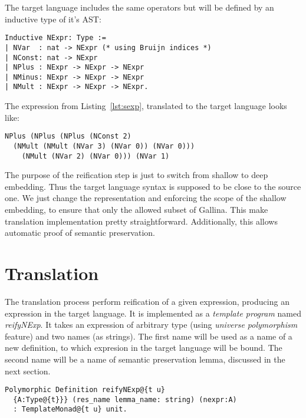 \documentclass[sigplan]{acmart}\settopmatter{printfolios=true,printccs=false,printacmref=false}
\begin{document}
The target language includes the same operators but will be defined by
an inductive type of it's AST:

\begin{lstlisting}[language=Coq, mathescape=true,
  frame=single,basicstyle=\footnotesize]
Inductive NExpr: Type :=
| NVar  : nat -> NExpr (* using Bruijn indices *)
| NConst: nat -> NExpr
| NPlus : NExpr -> NExpr -> NExpr
| NMinus: NExpr -> NExpr -> NExpr
| NMult : NExpr -> NExpr -> NExpr.
\end{lstlisting}

The expression from Listing~\ref{lst:sexp}, translated to the target
language looks like:

\begin{lstlisting}[language=Coq, mathescape=true,
  frame=single, basicstyle=\footnotesize,
  caption=Expression in target language, label=lst:texp]
NPlus (NPlus (NPlus (NConst 2)
  (NMult (NMult (NVar 3) (NVar 0)) (NVar 0)))
    (NMult (NVar 2) (NVar 0))) (NVar 1)
\end{lstlisting}

The purpose of the reification step is just to switch from shallow to
deep embedding. Thus the target language syntax is supposed to be
close to the source one. We just change the representation and
enforcing the scope of the shallow embedding, to ensure that only the
allowed subset of Gallina. This make translation implementation pretty
straightforward. Additionally, this allows automatic proof of semantic
preservation.

\section{Translation}

The translation process perform reification of a given expression,
producing an expression in the target language. It is implemented as a
\textit{template program} named \emph{reifyNExp}. It takes an
expression of arbitrary type (using \textit{universe polymorphism}
feature) and two names (as strings). The first name will be used as a
name of a new definition, to which expresion in the target language
will be bound. The second name will be a name of semantic preservation
lemma, discussed in the next section.

\begin{lstlisting}[language=Coq, mathescape=true,
  frame=single, basicstyle=\footnotesize]
Polymorphic Definition reifyNExp@{t u}
  {A:Type@{t}}} (res_name lemma_name: string) (nexpr:A)
  : TemplateMonad@{t u} unit.
\end{lstlisting}
\end{document}
